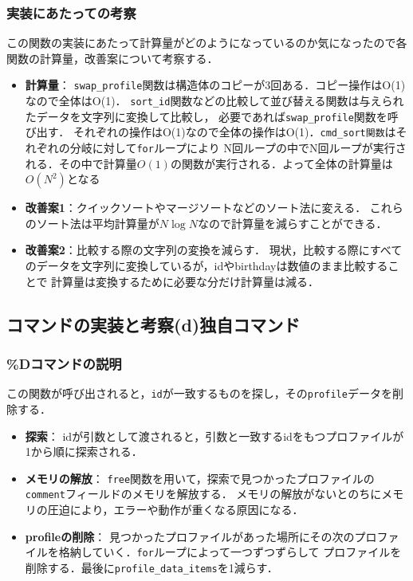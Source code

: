     \subsubsection{実装にあたっての考察}
    この関数の実装にあたって計算量がどのようになっているのか気になったので各関数の計算量，改善案について考察する．
    \begin{itemize}
      \item \textbf{計算量}：
        \texttt{swap\_profile}関数は構造体のコピーが3回ある．コピー操作はO(1)なので全体はO(1)．
        \texttt{sort\_id}関数などの比較して並び替える関数は与えられたデータを文字列に変換して比較し，
        必要であれば\texttt{swap\_profile}関数を呼び出す．
        それぞれの操作はO(1)なので全体の操作はO(1)．\texttt{cmd\_sort関数}はそれぞれの分岐に対して\texttt{for}ループにより
        N回ループの中でN回ループが実行される．その中で計算量$O(1)$の関数が実行される．よって全体の計算量は$O(N^2)$となる
      \item \textbf{改善案1}：クイックソートやマージソートなどのソート法に変える．
      これらのソート法は平均計算量が$N \log N$なので計算量を減らすことができる．
      \item \textbf{改善案2}：比較する際の文字列の変換を減らす．
      現状，比較する際にすべてのデータを文字列に変換しているが，idやbirthdayは数値のまま比較することで
      計算量は変換するために必要な分だけ計算量は減る．
        
    \end{itemize}
    

  \subsection{コマンドの実装と考察(d)独自コマンド}
    \subsubsection{\%Dコマンドの説明}
    この関数が呼び出されると，\texttt{id}が一致するものを探し，その\texttt{profile}データを削除する．
    \begin{itemize}
      \item\textbf{探索}：
      idが引数として渡されると，引数と一致するidをもつプロファイルが1から順に探索される．
      \item\textbf{メモリの解放}：
      \texttt{free}関数を用いて，探索で見つかったプロファイルの\texttt{comment}フィールドのメモリを解放する．
      メモリの解放がないとのちにメモリの圧迫により，エラーや動作が重くなる原因になる．
      \item \textbf{profileの削除}：
      見つかったプロファイルがあった場所にその次のプロファイルを格納していく．\texttt{for}ループによって一つずつずらして
      プロファイルを削除する．最後に\texttt{profile\_data\_items}を1減らす．

    \end{itemize}
